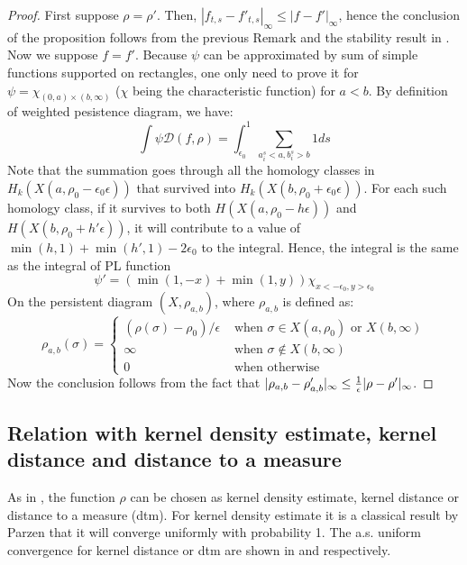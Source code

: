\documentclass[11pt]{article}
\theoremstyle{plain}
\theoremstyle{definition}
\theoremstyle{definition}
\theoremstyle{definition}
\theoremstyle{definition}
\theoremstyle{definition}
\theoremstyle{definition}
\theoremstyle{definition}
\theoremstyle{definition}
\begin{document}
\begin{proof}
  First suppose $\rho=\rho'$. Then, $|f_{t,s}-f'_{t,s}|_\infty\leq |f-f'|_\infty$, hence the conclusion of the proposition follows from the previous Remark and the stability result in \cite{CdSO}.\\

  Now we suppose $f=f'$. Because $\psi$ can be approximated by sum of simple functions supported on rectangles, one only need to prove it for $\psi=\chi_{(0, a)\times (b, \infty)}$ ($\chi$ being the characteristic function) for $a<b$. By definition of weighted pesistence diagram, we have:
  \begin{equation}
\int\psi \mathcal{D}(f,\rho)=\int_{\epsilon_0}^1\sum_{a_i^s<a, b_i^s>b}1 ds
\end{equation}
Note that the summation goes through all the homology classes in $H_k(X(a, \rho_0-\epsilon_0\epsilon))$ that survived into $H_k(X(b, \rho_0+\epsilon_0\epsilon))$. For each such homology class, if it survives to both $H(X(a, \rho_0-h\epsilon))$ and $H(X(b, \rho_0+h'\epsilon))$, it will contribute to a value of $\min(h, 1)+\min(h', 1)-2\epsilon_0$ to the integral. Hence, the integral is the same as the integral of PL function
\[\psi'=(\min(1, -x)+\min(1,y))\chi_{x<-\epsilon_0, y>\epsilon_0}\]
On the persistent diagram $(X, \rho_{a,b})$, where $\rho_{a,b}$ is defined as: 
\begin{equation}
\rho_{a,b}(\sigma)=\begin{cases}(\rho(\sigma)-\rho_0)/\epsilon &\text{ when }\sigma\in X(a, \rho_0)\text{ or }X(b,\infty)\\ \infty &\text{ when }\sigma\not\in X(b,\infty)\\ 0 &\text{ when otherwise }\end{cases}
\end{equation}
Now the conclusion follows from the fact that $|\rho_{a,b}-\rho'_{a,b}|_\infty\leq {1\over \epsilon}|\rho-\rho'|_\infty$. 
\end{proof}

\subsection{Relation with kernel density estimate, kernel distance and distance to a measure}

As in \cite{C}, the function $\rho$ can be chosen as kernel density estimate, kernel distance or distance to a measure (dtm). For kernel density estimate it is a classical result by Parzen that it will converge uniformly with probability 1. The a.s. uniform convergence for kernel distance or dtm are shown in \cite{PWZ} and \cite{C} respectively.  
\end{document}
